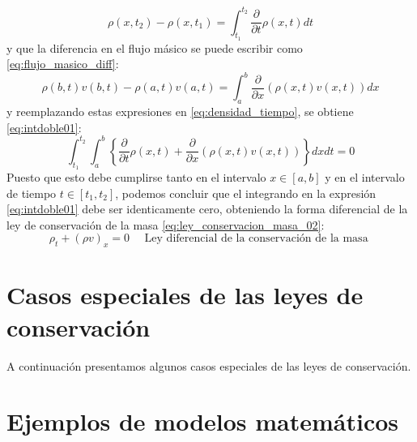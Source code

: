 \begin{equation}\label{eq:densidad_variable}
\rho\left(x, t_{2}\right)-\rho\left(x, t_{1}\right)=\int_{t_{1}}^{t_{2}} \frac{\partial}{\partial t} \rho(x, t) d t
\end{equation}
y que la diferencia en el flujo másico se puede escribir como \eqref{eq:flujo_masico_diff}: 
\begin{equation}\label{eq:flujo_masico_diff}
\rho\left(b, t\right) v\left(b, t\right)-\rho\left(a, t\right) v\left(a, t\right)=\int_{a}^{b} \frac{\partial}{\partial x}(\rho(x, t) v(x, t)) d x
\end{equation}
y reemplazando estas expresiones en \eqref{eq:densidad_tiempo}, se obtiene \eqref{eq:intdoble01}:
\begin{equation}\label{eq:intdoble01}
\int_{t_{1}}^{t_{2}} \int_{a}^{b}\left\{\frac{\partial}{\partial t} \rho(x, t)+\frac{\partial}{\partial x}(\rho(x, t) v(x, t))\right\} d x d t=0
\end{equation}
Puesto que esto debe cumplirse tanto en el intervalo  $x\in\left[a, b\right]$ y en el intervalo de tiempo $t\in\left[t_{1}, t_{2}\right]$, podemos concluir que el integrando en la expresión \eqref{eq:intdoble01} debe ser identicamente cero, obteniendo la forma diferencial de la ley de conservación de la masa \eqref{eq:ley_conservacion_masa_02}:
\begin{equation}\label{eq:ley_conservacion_masa_02}
\rho_{t}+(\rho v)_{x}=0 \quad \text { Ley diferencial de la conservación de la masa }
\end{equation}

\section{Casos especiales de las leyes de conservación}
A continuación presentamos algunos casos especiales de las leyes de conservación.

\section{Ejemplos de modelos matemáticos}


